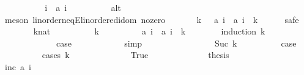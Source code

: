 \begin{isabellebody}
\ \ \ \ \isamarkupfalse%
\isanewline
\isanewline
\ \ \ \ \isamarkupfalse%
\ i\ \ {\isachardoublequoteopen}{\isacharquery}a\ i\ {\isacharless}\ {}{\isachardoublequoteclose}\isanewline
\ \ \ \ \ \ \isamarkupfalse%
\ alt\isanewline
\ \ \ \ \ \ \isamarkupfalse%
\ {\isacharparenleft}meson\ linorder{\isacharunderscore}neqE{\isacharunderscore}linordered{\isacharunderscore}idom\ no{\isacharunderscore}zero{\isacharparenright}\isanewline
\ \ \ \ \isamarkupfalse%
\ {\isachardoublequoteopen}{\isasymforall}\ k\ {\isasymge}\ {}{\isachardot}\ {\isacharquery}a\ i\ {\isacharless}\ {\isacharquery}a\ {\isacharparenleft}i\ {\isacharplus}\ {}{\isacharasterisk}k{\isacharparenright}{\isachardoublequoteclose}\isanewline
\ \ \ \ \isamarkupfalse%
\ safe\isanewline
\ \ \ \ \ \ \isamarkupfalse%
\ k{\isacharcolon}{\isacharcolon}nat\isanewline
\ \ \ \ \ \ \isamarkupfalse%
\ {\isachardoublequoteopen}{}\ {\isasymle}\ k{\isachardoublequoteclose}\isanewline
\ \ \ \ \ \ \isamarkupfalse%
\ \isamarkupfalse%
\ {\isachardoublequoteopen}{\isacharquery}a\ i\ {\isacharless}\ {\isacharquery}a\ {\isacharparenleft}i\ {\isacharplus}\ {}{\isacharasterisk}k{\isacharparenright}{\isachardoublequoteclose}\isanewline
\ \ \ \ \ \ \isamarkupfalse%
\ {\isacharparenleft}induction\ k{\isacharparenright}\isanewline
\ \ \ \ \ \ \ \ \isamarkupfalse%
\ {}\isanewline
\ \ \ \ \ \ \ \ \isamarkupfalse%
\ \isamarkupfalse%
\ {\isacharquery}case\isanewline
\ \ \ \ \ \ \ \ \ \ \isamarkupfalse%
\ simp\isanewline
\ \ \ \ \ \ \isamarkupfalse%
\isanewline
\ \ \ \ \ \ \ \ \isamarkupfalse%
\ {\isacharparenleft}Suc\ k{\isacharparenright}\isanewline
\ \ \ \ \ \ \ \ \isamarkupfalse%
\ {\isacharquery}case\isanewline
\ \ \ \ \ \ \ \ \isamarkupfalse%
\ {\isacharparenleft}cases\ {\isachardoublequoteopen}k\ {\isacharequal}\ {}{\isachardoublequoteclose}{\isacharparenright}\isanewline
\ \ \ \ \ \ \ \ \ \ \isamarkupfalse%
\ True\isanewline
\ \ \ \ \ \ \ \ \ \ \isamarkupfalse%
\ \isamarkupfalse%
\ {\isacharquery}thesis\isanewline
\ \ \ \ \ \ \ \ \ \ \ \ \isamarkupfalse%
\ inc\ {\isacharbackquoteopen}{\isacharquery}a\ i\ {\isacharless}\ {}{\isacharbackquoteclose}\isanewline

\end{isabellebody}
